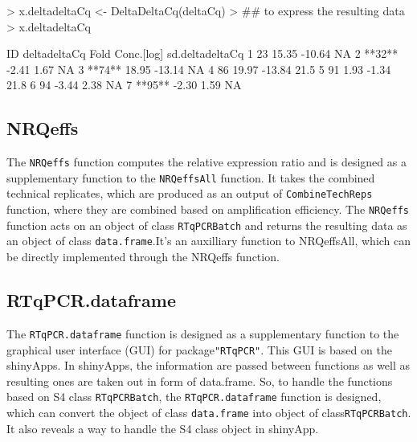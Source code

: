 \documentclass[11pt]{article}
\newcommand{\code}[1]{{\tt #1}}
\newcommand{\pkg}[1]{{\tt "#1"}}
\begin{document}
\begin{Schunk}
\begin{Sinput}
> x.deltadeltaCq <- DeltaDeltaCq(deltaCq)
> ## to express the resulting data
> x.deltadeltaCq  
\end{Sinput}
\begin{Soutput}
      ID deltadeltaCq Fold Conc.[log] sd.deltadeltaCq
1     23        15.35          -10.64              NA
2 **32**        -2.41            1.67              NA
3 **74**        18.95          -13.14              NA
4     86        19.97          -13.84            21.5
5     91         1.93           -1.34            21.8
6     94        -3.44            2.38              NA
7 **95**        -2.30            1.59              NA
\end{Soutput}
\end{Schunk}

\subsection{NRQeffs} 
The \code{NRQeffs} function computes the relative expression ratio and is designed as a supplementary function to the \code{NRQeffsAll} function. It takes the combined technical replicates, which are produced as an output of \code{CombineTechReps} function, where they are combined based on amplification efficiency. The \code{NRQeffs} function acts on an object of class \code{RTqPCRBatch} and returns the resulting data as an object of class \code{data.frame}.It's an auxilliary function to NRQeffsAll, which can be directly implemented through the NRQeffs
function.

\subsection{RTqPCR.dataframe} 
The \code{RTqPCR.dataframe} function is designed as a supplementary function to the graphical user interface (GUI) for package\pkg{RTqPCR}. This GUI is based on the shinyApps. In shinyApps, the information are passed between functions as well as resulting ones are taken out in form of data.frame. So, to handle the functions based on S4 class \code{RTqPCRBatch}, the \code{RTqPCR.dataframe} function is designed, which can convert the object of class \code{data.frame} into object of class\code{RTqPCRBatch}. It also reveals a way to handle the S4 class object in shinyApp.
\end{document}
